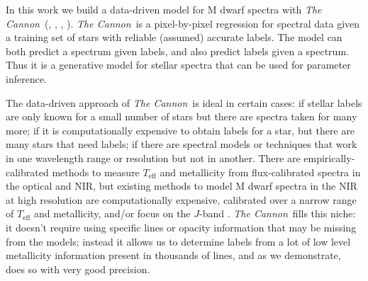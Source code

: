 \documentclass[modern]{aastex62}
\newcommand{\thecannon}{\textsl{The Cannon}}
\newcommand{\teff}{T_{\mathrm{eff}}}
\begin{document}

In this work we build a data-driven model for M dwarf spectra with \thecannon\ (\citealt{Ness:2015}, \citealt{Ho:2017a}, \citealt{Casey:2016}, \citealt{Behmard2019}).
\thecannon\ is a pixel-by-pixel regression for spectral data given a training set of stars with reliable (assumed) accurate labels. The model can both predict a spectrum given labels, and also predict labels given a spectrum. Thus it is a generative model for stellar spectra that can be used for parameter inference.

The data-driven approach of \thecannon\ is ideal in certain cases:
if stellar labels are only known for a small number of stars
but there are spectra taken for many more;
if it is computationally expensive to obtain labels for a star, but
there are many stars that need labels;
if there are spectral models or techniques that work in one wavelength range or resolution but not in another.
There are empirically-calibrated methods to measure $\teff$ and metallicity from flux-calibrated spectra in the optical and NIR, but existing methods to model M dwarf spectra in the NIR at high resolution are computationally expensive, calibrated over a narrow range of $\teff$ and metallicity, and/or focus on the $J$-band \citep{Lindgren:2016, Lindgren:2017}. \thecannon\ fills this niche: it doesn't require using specific lines or opacity information that may be missing from the models; instead it allows us to determine labels from a lot of low level metallicity information present in thousands of lines, and as we demonstrate, does so with very good precision.
\end{document}
